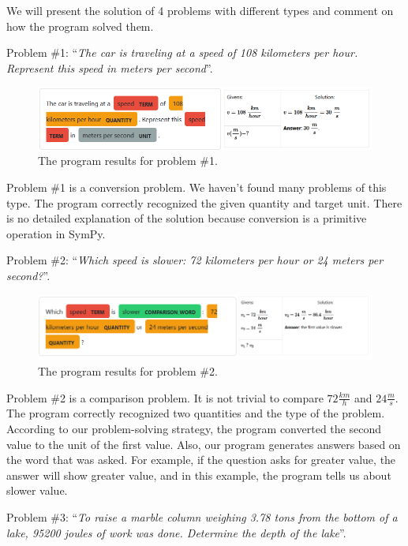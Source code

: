 \documentclass[a4paper, 12pt]{article}
\newcommand{\etext}[1]{\enquote{\textit{#1}}}
\begin{document}
	We will present the solution of 4 problems with different types and
	comment on how the program solved them.
	
	Problem \#1: \etext{The car is traveling at a speed of 108 kilometers
	per hour. Represent this speed in meters per second}.
	
	\begin{figure}[h]
		\centering
		\includegraphics[width=\textwidth]{media/image5.png}
		\caption{The program results for problem \#1.}
	\end{figure}
	
	Problem \#1 is a conversion problem. We haven't found many problems of
	this type. The program correctly recognized the given quantity and
	target unit. There is no detailed explanation of the solution because
	conversion is a primitive operation in SymPy.
	
	Problem \#2: \etext{Which speed is slower: 72 kilometers per hour or 24
	meters per second?}.
	
	\begin{figure}[h]
		\centering
		\includegraphics[width=\textwidth]{media/image6.png}
		\caption{The program results for problem \#2.}
	\end{figure}
	
	Problem \#2 is a comparison problem. It is not trivial to compare
	\(72\frac{km}{h}\) and \(24\frac{m}{s}\). The program correctly
	recognized two quantities and the type of the problem. According to our
	problem-solving strategy, the program converted the second value to the
	unit of the first value. Also, our program generates answers based on
	the word that was asked. For example, if the question asks for greater
	value, the answer will show greater value, and in this example, the
	program tells us about slower value.
	
	Problem \#3: \etext{To raise a marble column weighing 3.78 tons from
	the bottom of a lake, 95200 joules of work was done. Determine the depth
	of the lake}.
	
\end{document}
